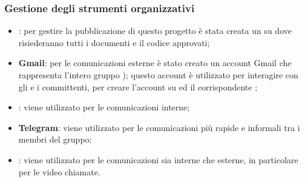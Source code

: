 \subsubsection{Gestione degli strumenti organizzativi}
\begin{itemize}
	\item \textbf{}: per gestire la pubblicazione di questo progetto è stata creata un  su  dove risiederanno tutti i documenti e il codice approvati;
	\item \textbf{Gmail}: per le comunicazioni esterne è stato creato un account Gmail che rappresenta l’intero gruppo \Mail{}); questo account è utilizzato per interagire con gli
 e i committenti, per creare l’account su  ed il corrispondente ;
	\item \textbf{}: viene utilizzato per le comunicazioni interne;
	\item \textbf{Telegram}: viene utilizzato per le comunicazioni più rapide e informali tra i membri del
gruppo;
	\item \textbf{}: viene utilizzato per le comunicazioni sia interne che esterne, in particolare per le video chiamate.
\end{itemize}
